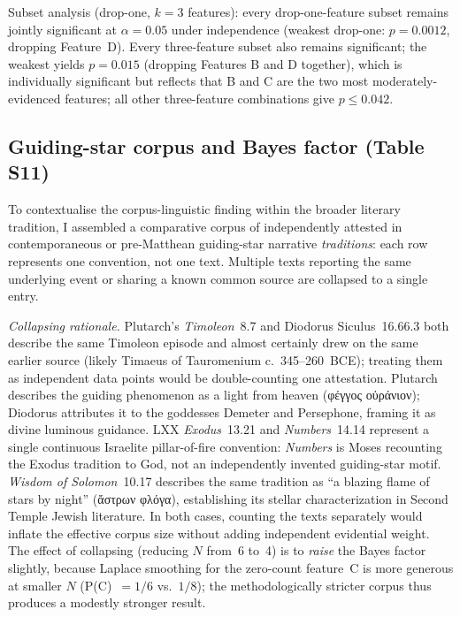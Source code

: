 \documentclass[11pt,a4paper]{article}
\newcommand{\grk}[1]{{\fontencoding{LGR}\selectfont #1}}
\newcommand{\grk}[1]{{\greekfont #1}}
\begin{document}
Subset analysis (drop-one, $k=3$ features): every drop-one-feature subset
remains jointly significant at $\alpha = 0.05$ under independence (weakest
drop-one: $p = 0.0012$, dropping Feature~D). Every three-feature subset also
remains significant; the weakest yields $p = 0.015$ (dropping Features B and D
together), which is
individually significant but reflects that B and C are the two most
moderately-evidenced features; all other three-feature combinations give
$p \leq 0.042$.

\subsection{Guiding-star corpus and Bayes factor (Table S11)}

To contextualise the corpus-linguistic finding within the broader literary
tradition, I assembled a comparative corpus of independently attested in contemporaneous or
pre-Matthean guiding-star narrative \emph{traditions}: each row represents
one convention, not one text. Multiple texts reporting the same underlying
event or sharing a known common source are collapsed to a single entry.

\medskip\noindent\textit{Collapsing rationale.}
Plutarch's \textit{Timoleon}~8.7 and Diodorus Siculus~16.66.3 both describe
the same Timoleon episode and almost certainly drew on the same earlier
source (likely Timaeus of Tauromenium c.~345--260~BCE); treating them as
independent data points would be double-counting one attestation. Plutarch
describes the guiding phenomenon as a light from heaven (\grk{φέγγος
οὐράνιον}); Diodorus attributes it to the goddesses Demeter and Persephone,
framing it as divine luminous guidance.
LXX \textit{Exodus}~13.21 and \textit{Numbers}~14.14 represent a single
continuous Israelite pillar-of-fire convention: \textit{Numbers} is Moses
recounting the Exodus tradition to God, not an independently invented
guiding-star motif. \textit{Wisdom of Solomon}~10.17 describes the same
tradition as ``a blazing flame of stars by night''
(\grk{ἄστρων φλόγα}), establishing its stellar characterization in
Second Temple Jewish literature. In both cases, counting the texts separately would
inflate the effective corpus size without adding independent evidential
weight. The effect of collapsing (reducing $N$ from~6 to~4) is to
\emph{raise} the Bayes factor slightly, because Laplace smoothing for the
zero-count feature~C is more generous at smaller $N$ (P(C)~$= 1/6$ vs.\
$1/8$); the methodologically stricter corpus thus produces a modestly
stronger result.
\end{document}
